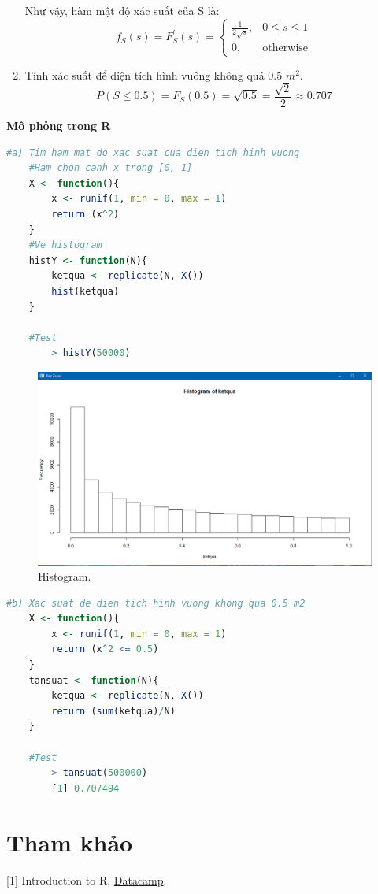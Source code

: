 \documentclass[a4paper,12pt]{article}
\begin{document}
\begin{enumerate}[label = \alph*)]
		Như vậy, hàm mật độ xác suất của S là:
		\begin{equation*}
			f_S(s) = F^{'}_S(s) = 
			\begin{cases}
				\frac{1}{2\sqrt{s}}, & \text{$0 \leq s \leq 1$} \\
				0, & \text{otherwise}
			\end{cases}
		\end{equation*}
		
	\item Tính xác suất để diện tích hình vuông không quá 0.5 $m^2$. \\
	
	\begin{equation*}
		P(S \leq 0.5) = F_S(0.5) = \sqrt{0.5} = \frac{\sqrt{2}}{2} \approx 0.707 
	\end{equation*}
		
\end{enumerate}

{\large\textbf{Mô phỏng trong R}} \\
\begin{lstlisting}[language=R]
	#a) Tim ham mat do xac suat cua dien tich hinh vuong
	#Ham chon canh x trong [0, 1]
	X <- function(){
		x <- runif(1, min = 0, max = 1)
		return (x^2)
	}
	#Ve histogram
	histY <- function(N){
		ketqua <- replicate(N, X())
		hist(ketqua)
	}
	
	#Test
		> histY(50000)
\end{lstlisting}

\begin{figure}[h!]
	\includegraphics[width=\linewidth]{hist.png}
	\caption{Histogram.}
	\label{fig:hist}
\end{figure}

\begin{lstlisting}[language=R]
	#b) Xac suat de dien tich hinh vuong khong qua 0.5 m2
	X <- function(){
		x <- runif(1, min = 0, max = 1)
		return (x^2 <= 0.5)
	}
	tansuat <- function(N){
		ketqua <- replicate(N, X())
		return (sum(ketqua)/N)
	}
	
	#Test
		> tansuat(500000)
		[1] 0.707494

\end{lstlisting}

\section{Tham khảo}
\label{Tham khao}
[1] Introduction to R, \href{https://campus.datacamp.com/courses/free-introduction-to-r}{Datacamp}. \\
\end{document}
